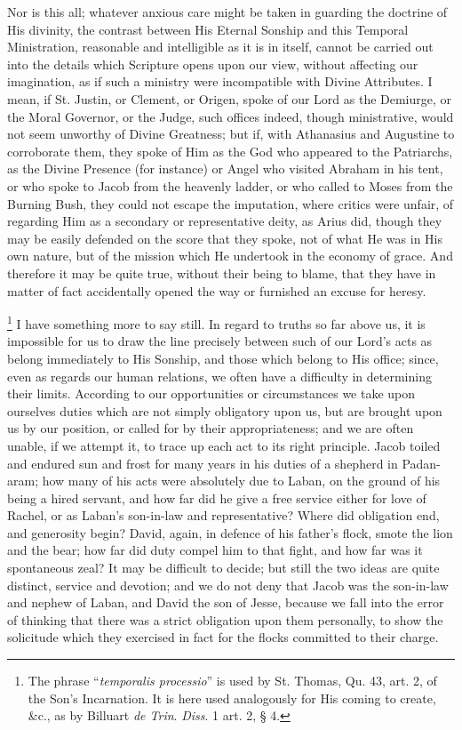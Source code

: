 Nor is this all; whatever anxious care might be taken in guarding
the doctrine of His divinity, the contrast between His Eternal Sonship
and this Temporal Ministration, reasonable and intelligible as it is
in itself, cannot be carried out into the details which Scripture
opens upon our view, without affecting our imagination, as if such a
ministry were incompatible with Divine Attributes. I mean, if St.
Justin, or Clement, or Origen, spoke of our Lord as the Demiurge, or
the Moral Governor, or the Judge, such offices indeed, though
ministrative, would not seem unworthy of Divine Greatness; but if,
with Athanasius and Augustine to corroborate them, they spoke of Him
as the God who appeared to the Patriarchs, as the Divine Presence (for
instance) or Angel who visited Abraham in his tent, or who spoke to
Jacob from the heavenly ladder, or who called to Moses from the
Burning Bush, they could not escape the imputation, where critics were
unfair, of regarding Him as a secondary or representative deity, as
Arius did, though they may be easily defended on the score that they
spoke, not of what He was in His own nature, but of the mission which
He undertook in the economy of grace. And therefore it may be quite
true, without their being to blame, that they have in matter of fact
accidentally opened the way or furnished an excuse for heresy.


\footnote{The phrase ``\emph{temporalis processio}'' is used by St.
Thomas, Qu. 43, art. 2, of the Son's Incarnation. It is here used
analogously for His coming to create, \&c., as by Billuart \emph{de
Trin}. \emph{Diss}. 1 art. 2, § 4.} I have something
more to say still. In regard to truths so far above us, it is
impossible for us to draw the line precisely between such of our Lord's
acts as belong immediately to His Sonship, and those which belong to
His office; since, even as regards our human relations, we often have
a difficulty in determining their limits. According to our
opportunities or circumstances we take upon ourselves duties which are
not simply obligatory upon us, but are brought upon us by our
position, or called for by their appropriateness; and we are often
unable, if we attempt it, to trace up each act to its right principle.
Jacob toiled and endured sun and frost for many years in his duties of
a shepherd in Padan-aram; how many of his acts were absolutely due to
Laban, on the ground of his being a hired servant, and how far did he
give a free service either for love of Rachel, or as Laban's
son-in-law and representative? Where did obligation end, and
generosity begin? David, again, in defence of his father's flock,
smote the lion and the bear; how far did duty compel him to that
fight, and how far was it spontaneous zeal? It may be difficult to
decide; but still the two ideas are quite distinct, service and
devotion; and we do not deny that Jacob was the son-in-law and
nephew of Laban, and David the son of Jesse, because we fall into the
error of thinking that there was a strict obligation upon them
personally, to show the solicitude which they exercised in fact for
the flocks committed to their charge.

